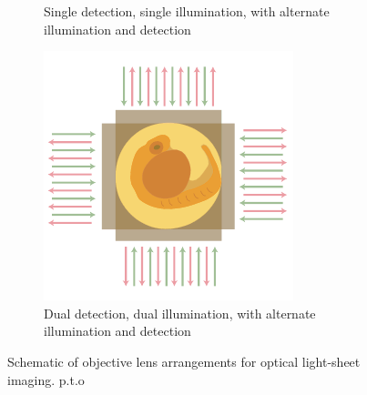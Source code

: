 \begin{figure}
\begin{subfigure}[t]{0.4\textwidth}
        \caption{Single detection, single illumination, with alternate illumination and detection~\cite{kumar_dual-view_2014}}
        \label{fig:depth/di_spim}
    \end{subfigure}\hspace{0.07\textwidth}
    \begin{subfigure}[t]{0.4\textwidth}
        \centering
        \includegraphics{depth/muvi}
        \caption{Dual detection, dual illumination, with alternate illumination and detection}
        \label{fig:depth/muvi}
    \end{subfigure}
        \caption[Schematic of objective lens arrangements for optical \gls{light-sheet} imaging]{Schematic of objective lens arrangements for optical \gls{light-sheet} imaging.
        p.t.o}
\end{figure}
